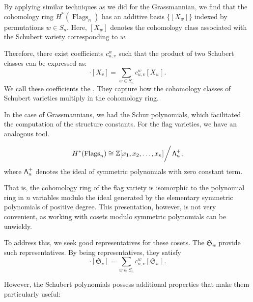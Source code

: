 By applying similar techniques as we did for the Grassmannian, we find that the cohomology ring \(H^*(\operatorname{Flags}_n)\) has an additive basis \(\{[X_w]\}\) indexed by permutations \(w \in S_n\). Here, \([X_w]\) denotes the cohomology class associated with the Schubert variety corresponding to \(w\).

Therefore, there exist coefficients \(c_{u,v}^w\) such that the product of two Schubert classes can be expressed as:
\begin{equation}
    [X_u] \cdot [X_v] = \sum_{w \in S_n} c_{u,v}^w [X_w].
\end{equation}
We call these coefficients the . They capture how the cohomology classes of Schubert varieties multiply in the cohomology ring.

In the case of Grassmannians, we had the Schur polynomials, which facilitated the computation of the structure constants. For the flag varieties, we have an analogous tool.

\begin{theorem}[Borel]
    \begin{equation}
        H^*(\operatorname{Flags}_n) \cong \mathbb{Z}[x_1, x_2, \ldots, x_n] \bigg/ \operatorname{\mathsf{\Lambda}}_{n}^+,
    \end{equation}
    where \(\operatorname{\mathsf{\Lambda}}_{n}^+\) denotes the ideal of symmetric polynomials with zero constant term.
\end{theorem}

That is, the cohomology ring of the flag variety is isomorphic to the polynomial ring in \(n\) variables modulo the ideal generated by the elementary symmetric polynomials of positive degree. This presentation, however, is not very convenient, as working with cosets modulo symmetric polynomials can be unwieldy.

To address this, we seek good representatives for these cosets.
The  \(\mathfrak{S}_w\) provide such representatives.
By being representatives, they satisfy
\begin{equation}
    [\mathfrak{S}_u] \cdot [\mathfrak{S}_v] = \sum_{w \in S_n} c_{u,v}^w [\mathfrak{S}_w].
\end{equation}

However, the Schubert polynomials possess additional properties that make them particularly useful:

